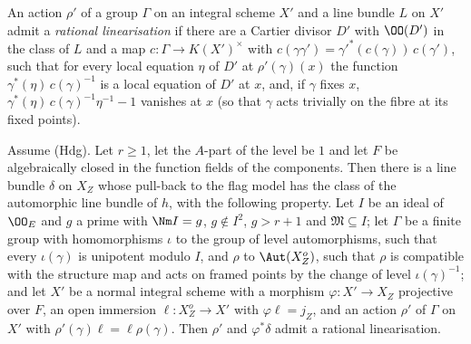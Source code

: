 An action $\rho'$ of a group $\Gamma$ on an integral scheme $X'$ and a line bundle $L$ on $X'$ admit a
\emph{rational linearisation} if there are a Cartier divisor $D'$ with $\OO(D')$ in the class of $L$ and a
map $c\colon\Gamma\to K(X')^\times$ with $c(\gamma\gamma')=\gamma'^*(c(\gamma))\,c(\gamma')$, such that for
every local equation $\eta$ of $D'$ at $\rho'(\gamma)(x)$ the function $\gamma^*(\eta)\,c(\gamma)^{-1}$ is a local
equation of $D'$ at $x$, and, if $\gamma$ fixes $x$, $\gamma^*(\eta)\,c(\gamma)^{-1}\eta^{-1}-1$ vanishes at $x$ (so
that $\gamma$ acts trivially on the fibre at its fixed points).

\begin{theorem}\label{pf:lift1:hodgelin}
Assume (Hdg). Let $r\ge1$, let the $A$-part of the level be $1$ and let $F$ be algebraically closed in the
function fields of the components. Then there is a line bundle $\delta$ on $X_Z$ whose pull-back to the
flag model has the class of the automorphic line bundle of $h$, with the following property. Let $I$ be an
ideal of $\OO_E$ and $g$ a prime with $\Nm I=g$, $g\notin I^2$, $g>r+1$ and $\mathfrak M\subseteq I$; let
$\Gamma$ be a finite group with homomorphisms $\iota$ to the group of level automorphisms, such that
every $\iota(\gamma)$ is unipotent modulo $I$, and $\rho$ to $\Aut(X_Z^o)$, such that $\rho$ is compatible
with the structure map and acts on framed points by the change of level $\iota(\gamma)^{-1}$; and let $X'$
be a normal integral scheme with a morphism $\varphi\colon X'\to X_Z$ projective over $F$, an open immersion
$\ell\colon X_Z^o\to X'$ with $\varphi\ell=j_Z$, and an action $\rho'$ of $\Gamma$ on $X'$ with
$\rho'(\gamma)\ell=\ell\rho(\gamma)$. Then $\rho'$ and $\varphi^*\delta$ admit a rational linearisation.
\end{theorem}

